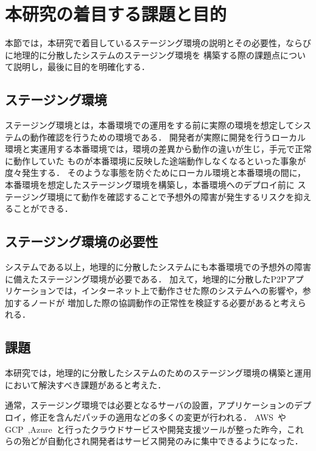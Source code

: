 \section{本研究の着目する課題と目的}
\label{introduction:issue-and-aim}

本節では，本研究で着目しているステージング環境の説明とその必要性，ならびに地理的に分散したシステムのステージング環境を
構築する際の課題点について説明し，最後に目的を明確化する．

\subsection{ステージング環境}

ステージング環境とは，本番環境での運用をする前に実際の環境を想定してシステムの動作確認を行うための環境である．
開発者が実際に開発を行うローカル環境と実運用する本番環境では，環境の差異から動作の違いが生じ，手元で正常に動作していた
ものが本番環境に反映した途端動作しなくなるといった事象が度々発生する．
そのような事態を防ぐためにローカル環境と本番環境の間に，本番環境を想定したステージング環境を構築し，本番環境へのデプロイ前に
ステージング環境にて動作を確認することで予想外の障害が発生するリスクを抑えることができる．

\subsection{ステージング環境の必要性}

システムである以上，地理的に分散したシステムにも本番環境での予想外の障害に備えたステージング環境が必要である．
加えて，地理的に分散したP2Pアプリケーションでは，インターネット上で動作させた際のシステムへの影響や，参加するノードが
増加した際の協調動作の正常性を検証する必要があると考えられる．

\subsection{課題}
\label{introduction:issue-and-aim:issue}

本研究では，地理的に分散したシステムのためのステージング環境の構築と運用において解決すべき課題があると考えた．

通常，ステージング環境では必要となるサーバの設置，アプリケーションのデプロイ，修正を含んだパッチの適用などの多くの変更が行われる．
AWS~\cite{AWS}やGCP~\cite{GCP},Azure~\cite{Azure}と行ったクラウドサービスや開発支援ツールが整った昨今，これらの殆どが自動化され開発者はサービス開発のみに集中できるようになった．

